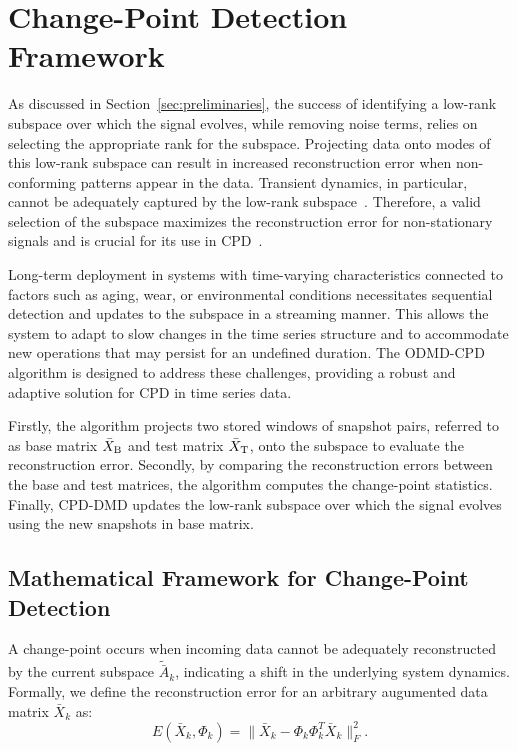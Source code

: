 \section{Change-Point Detection Framework}\label{sec:method}

As discussed in Section~\ref{sec:preliminaries}, the success of identifying a low-rank subspace over which the signal evolves, while removing noise terms, relies on selecting the appropriate rank for the subspace. Projecting data onto modes of this low-rank subspace can result in increased reconstruction error when non-conforming patterns appear in the data. Transient dynamics, in particular, cannot be adequately captured by the low-rank subspace~\cite{Kuehn2011, Gottwald2020}. Therefore, a valid selection of the subspace maximizes the reconstruction error for non-stationary signals and is crucial for its use in CPD~\cite{Moskvina2003}.

Long-term deployment in systems with time-varying characteristics connected to factors such as aging, wear, or environmental conditions necessitates sequential detection and updates to the subspace in a streaming manner. This allows the system to adapt to slow changes in the time series structure and to accommodate new operations that may persist for an undefined duration. The ODMD-CPD algorithm is designed to address these challenges, providing a robust and adaptive solution for CPD in time series data.

Firstly, the algorithm projects two stored windows of snapshot pairs, referred to as base matrix \( \bar{X} _{\text{B}} \) and test matrix \( \bar{X} _{\text{T}} \), onto the subspace to evaluate the reconstruction error. Secondly, by comparing the reconstruction errors between the base and test matrices, the algorithm computes the change-point statistics. Finally, CPD-DMD updates the low-rank subspace over which the signal evolves using the new snapshots in base matrix.

\subsection{Mathematical Framework for Change-Point Detection}\label{sec:cpd-framework}

A change-point occurs when incoming data cannot be adequately reconstructed by the current subspace \( \tilde{\bar{A}}_k \), indicating a shift in the underlying system dynamics. Formally, we define the reconstruction error for an arbitrary augumented data matrix \(\bar{X}_k\) as:
\begin{equation}
\label{eq:reconstruction-error}
E(\bar{X}_k, \Phi_k) = \|\bar{X}_k - \Phi_k \Phi_k^T \bar{X}_k\|_F^2.
\end{equation}

